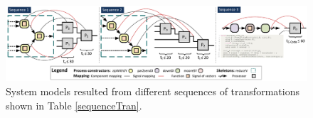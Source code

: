 \begin{figure}[t]
	\centering
	\includegraphics[width=0.986\linewidth]{figs-src/diffSequences.pdf}
	\caption{System models resulted from different sequences of transformations shown in Table \ref{sequenceTran}.}
	\label{sequenceResults}
\end{figure}

